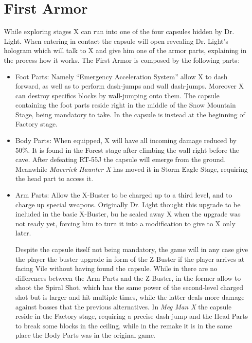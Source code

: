 \section{First Armor}\label{X1:Armor}
While exploring stages X can run into one of the four capsules hidden by Dr. Light. When entering in contact the capsule will open revealing Dr. Light's hologram which will talk to X and give him one of the armor parts\cite{wiki:First_armor}, explaining in the process how it works.
The First Armor is composed by the following parts:
\begin{itemize}
	\item Foot Parts: Namely ``Emergency Acceleration System''\cite{X:Manual} allow X to dash forward, as well as to perform dash-jumps and wall dash-jumps. Moreover X can destroy specifics blocks by wall-jumping onto them. The capsule containing the foot parts reside right in the middle of the Snow Mountain Stage, being mandatory to take. In \mhx the capsule is instead at the beginning of Factory stage.
	
	\item Body Parts: When equipped, X will have all incoming damage reduced by 50\%. It is found in the Forest stage after climbing the wall right before the cave. After defeating RT-55J the capsule will emerge from the ground. Meanwhile \textit{Maverick Haunter X} has moved it in Storm Eagle Stage, requiring the head part to access it.
	
	\item Arm Parts: Allow the X-Buster to be charged up to a third level, and to charge up special weapons. Originally Dr. Light thought this upgrade to be included in the basic X-Buster\cite{X:Manual}, bu he sealed away X when the upgrade was not ready yet, forcing him to turn it into a modification to give to X only later.
	
	Despite the capsule itself not being mandatory, the game will in any case give the player the buster upgrade in form of the Z-Buster if the player arrives at facing Vile without having found the capsule. While in \x there are no differences between the Arm Parts and the Z-Buster, in \mhx the former allow to shoot the Spiral Shot, which has the same power of the second-level charged shot but is larger and hit multiple times, while the latter deals more damage against bosses that the previous alternatives. In \textit{Meg Man X} the capsule reside in the Factory stage, requiring a precise dash-jump and the Head Parts to break some blocks in the ceiling, while in the remake it is in the same place the Body Parts was in the original game.
	

\end{itemize}
